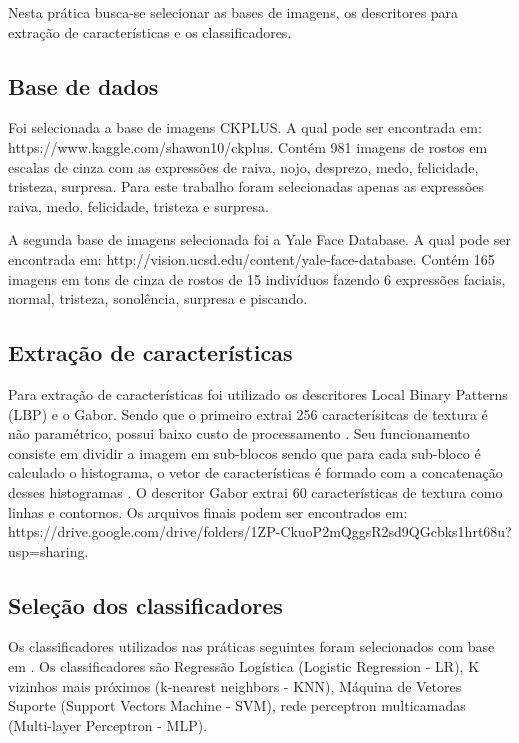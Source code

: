 Nesta prática busca-se selecionar as bases de imagens, os descritores para extração de características e os classificadores.

\subsection{Base de dados}
Foi selecionada a base de imagens CKPLUS. A qual pode ser encontrada em: https://www.kaggle.com/shawon10/ckplus. Contém 981 imagens de rostos em escalas de cinza com as expressões de raiva, nojo, desprezo, medo, felicidade, tristeza, surpresa. Para este trabalho foram selecionadas apenas as expressões raiva, medo, felicidade, tristeza e surpresa.

A segunda base de imagens selecionada foi a Yale Face Database. A qual pode ser encontrada em: http://vision.ucsd.edu/content/yale-face-database. Contém 165 imagens em tons de cinza de rostos de 15 indivíduos fazendo 6 expressões faciais, normal, tristeza, sonolência, surpresa e piscando.

\subsection{Extração de características}
Para extração de características foi utilizado os descritores Local Binary Patterns (LBP) e o Gabor. Sendo que o primeiro extrai 256 caracterísitcas de textura é não paramétrico, possui baixo custo de processamento \cite{rajan:19}. Seu funcionamento consiste em dividir a imagem em sub-blocos sendo que para cada sub-bloco é calculado o histograma, o vetor de características é formado com a concatenação desses histogramas \cite{rajan:19}. O descritor Gabor extrai 60 características de textura como linhas e contornos. Os arquivos finais podem ser encontrados em: https://drive.google.com/drive/folders/1ZP-CkuoP2mQggsR2sd9QGcbks1hrt68u?usp=sharing.

\subsection{Seleção dos classificadores}
Os classificadores utilizados nas práticas seguintes foram selecionados com base em \cite{rajan:19}. Os classificadores são Regressão Logística (Logistic Regression - LR), K vizinhos mais próximos (k-nearest neighbors - KNN), Máquina de Vetores Suporte (Support Vectors Machine - SVM), rede perceptron multicamadas (Multi-layer Perceptron - MLP).

